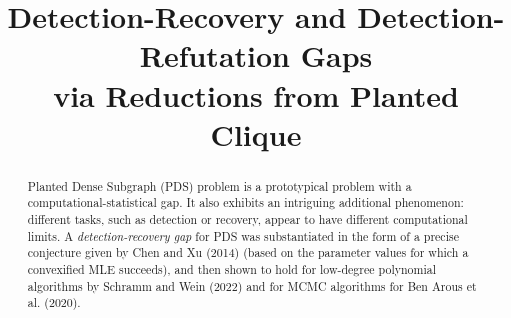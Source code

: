 \documentclass[final,12pt]{colt2023} %
\title[Detection-Recovery and Detection-Refutation Gaps]{Detection-Recovery and Detection-Refutation Gaps \\ via Reductions from Planted Clique}
\newcommand\1[1]{\mathbb{I}_{\left\{#1\right\}}}
\begin{document}
\maketitle

\begin{abstract}%
  


Planted Dense Subgraph (PDS) problem is a prototypical problem with a computational-statistical gap. It also exhibits an intriguing additional phenomenon: different tasks, such as detection or recovery, appear to have different computational limits. A \emph{detection-recovery gap} for PDS was substantiated in the form of a precise conjecture given by Chen and Xu (2014) (based on the parameter values for which a convexified MLE succeeds), and then shown to hold for low-degree polynomial algorithms by Schramm and Wein (2022) and for MCMC algorithms for Ben Arous et al. (2020). 


\end{abstract}
\end{document}
